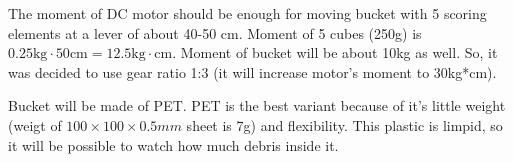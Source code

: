 \begin{enumerate*}
  	The moment of DC motor should be enough for moving bucket with 5 scoring elements at a lever of about 40-50 cm. Moment of 5 cubes (250g) is $0.25\text{kg} \cdot 50\text{cm} = 12.5\text{kg} \cdot \text{cm}$. Moment of bucket will be about 10kg as well. So, it was decided to use gear ratio 1:3 (it will increase motor's moment to 30kg*cm).
  	\begin{figure}[H]
  		\begin{minipage}[h]{1\linewidth}
  			\caption{}
  		\end{minipage}
  	\end{figure}
  	\item Bucket will be made of PET. PET is the best variant because of it's little weight (weigt of $100\times 100 \times 0.5mm$ sheet is 7g) and flexibility. This plastic is limpid, so it will be possible to watch how much debris inside it.
  	

\end{enumerate*}
